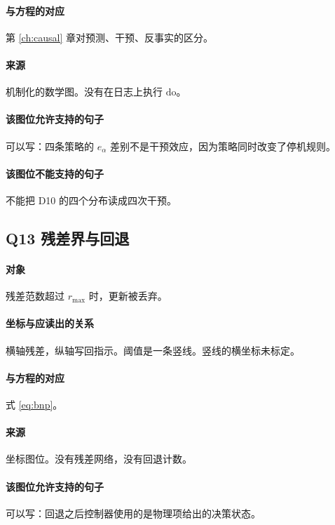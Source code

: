\paragraph{与方程的对应}
第 \ref{ch:causal} 章对预测、干预、反事实的区分。

\paragraph{来源}
机制化的数学图。没有在日志上执行 $\mathrm{do}$。

\paragraph{该图位允许支持的句子}
可以写：四条策略的 $e_\alpha$ 差别不是干预效应，因为策略同时改变了停机规则。

\paragraph{该图位不能支持的句子}
不能把 D10 的四个分布读成四次干预。

\subsection{Q13 残差界与回退}
\paragraph{对象}
残差范数超过 $r_{\max}$ 时，更新被丢弃。

\paragraph{坐标与应读出的关系}
横轴残差，纵轴写回指示。阈值是一条竖线。竖线的横坐标未标定。

\paragraph{与方程的对应}
式 \eqref{eq:bnp}。

\paragraph{来源}
坐标图位。没有残差网络，没有回退计数。

\paragraph{该图位允许支持的句子}
可以写：回退之后控制器使用的是物理项给出的决策状态。


